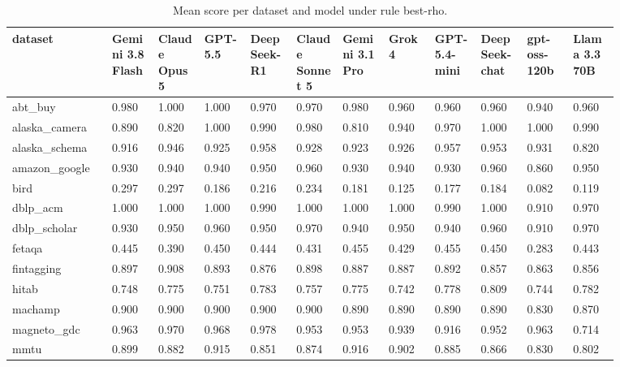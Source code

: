 \begin{landscape}
\tiny
\setlength{\tabcolsep}{3pt}
\begin{longtable}{p{0.134\linewidth}p{0.067\linewidth}p{0.067\linewidth}p{0.067\linewidth}p{0.067\linewidth}p{0.067\linewidth}p{0.067\linewidth}p{0.067\linewidth}p{0.067\linewidth}p{0.067\linewidth}p{0.067\linewidth}p{0.067\linewidth}}
\caption{Mean score per dataset and model under rule best-rho.}\label{tab:per_dataset_mean_best_anchor}\\
\toprule
dataset & Gemini 3.8 Flash & Claude Opus 5 & GPT-5.5 & DeepSeek-R1 & Claude Sonnet 5 & Gemini 3.1 Pro & Grok 4 & GPT-5.4-mini & DeepSeek-chat & gpt-oss-120b & Llama 3.3 70B \\
\midrule
abt\_\allowbreak{}buy & 0.980 & 1.000 & 1.000 & 0.970 & 0.970 & 0.980 & 0.960 & 0.960 & 0.960 & 0.940 & 0.960 \\
alaska\_\allowbreak{}camera & 0.890 & 0.820 & 1.000 & 0.990 & 0.980 & 0.810 & 0.940 & 0.970 & 1.000 & 1.000 & 0.990 \\
alaska\_\allowbreak{}schema & 0.916 & 0.946 & 0.925 & 0.958 & 0.928 & 0.923 & 0.926 & 0.957 & 0.953 & 0.931 & 0.820 \\
amazon\_\allowbreak{}google & 0.930 & 0.940 & 0.940 & 0.950 & 0.960 & 0.930 & 0.940 & 0.930 & 0.960 & 0.860 & 0.950 \\
bird & 0.297 & 0.297 & 0.186 & 0.216 & 0.234 & 0.181 & 0.125 & 0.177 & 0.184 & 0.082 & 0.119 \\
dblp\_\allowbreak{}acm & 1.000 & 1.000 & 1.000 & 0.990 & 1.000 & 1.000 & 1.000 & 0.990 & 1.000 & 0.910 & 0.970 \\
dblp\_\allowbreak{}scholar & 0.930 & 0.950 & 0.960 & 0.950 & 0.970 & 0.940 & 0.950 & 0.940 & 0.960 & 0.910 & 0.970 \\
fetaqa & 0.445 & 0.390 & 0.450 & 0.444 & 0.431 & 0.455 & 0.429 & 0.455 & 0.450 & 0.283 & 0.443 \\
fintagging & 0.897 & 0.908 & 0.893 & 0.876 & 0.898 & 0.887 & 0.887 & 0.892 & 0.857 & 0.863 & 0.856 \\
hitab & 0.748 & 0.775 & 0.751 & 0.783 & 0.757 & 0.775 & 0.742 & 0.778 & 0.809 & 0.744 & 0.782 \\
machamp & 0.900 & 0.900 & 0.900 & 0.900 & 0.900 & 0.890 & 0.890 & 0.890 & 0.890 & 0.830 & 0.870 \\
magneto\_\allowbreak{}gdc & 0.963 & 0.970 & 0.968 & 0.978 & 0.953 & 0.953 & 0.939 & 0.916 & 0.952 & 0.963 & 0.714 \\
mmtu & 0.899 & 0.882 & 0.915 & 0.851 & 0.874 & 0.916 & 0.902 & 0.885 & 0.866 & 0.830 & 0.802 \\

\end{longtable}
\end{landscape}

